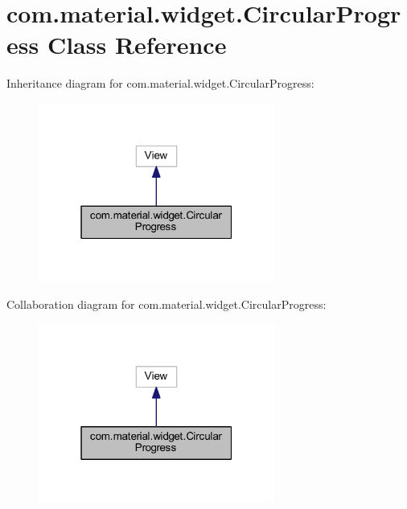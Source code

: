 \hypertarget{classcom_1_1material_1_1widget_1_1_circular_progress}{}\section{com.\+material.\+widget.\+Circular\+Progress Class Reference}
\label{classcom_1_1material_1_1widget_1_1_circular_progress}


Inheritance diagram for com.\+material.\+widget.\+Circular\+Progress\+:
\nopagebreak
\begin{figure}[H]
\begin{center}
\leavevmode
\includegraphics[width=220pt]{classcom_1_1material_1_1widget_1_1_circular_progress__inherit__graph}
\end{center}
\end{figure}


Collaboration diagram for com.\+material.\+widget.\+Circular\+Progress\+:
\nopagebreak
\begin{figure}[H]
\begin{center}
\leavevmode
\includegraphics[width=220pt]{classcom_1_1material_1_1widget_1_1_circular_progress__coll__graph}
\end{center}
\end{figure}

